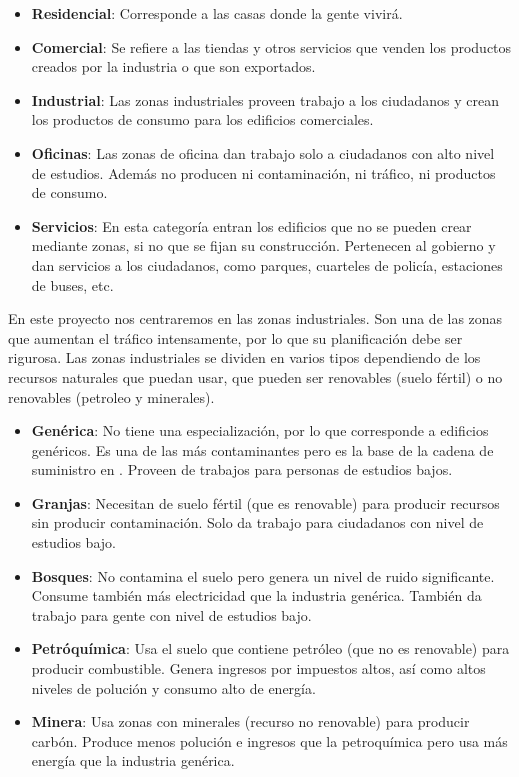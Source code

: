 \begin{itemize}
	\item \textbf{Residencial}: Corresponde a las casas donde la gente vivirá.
	\item \textbf{Comercial}: Se refiere a las tiendas y otros servicios que venden los productos creados por la industria o que son exportados.
	\item \textbf{Industrial}: Las zonas industriales proveen trabajo a los ciudadanos y crean los productos de consumo para los edificios comerciales.
	\item \textbf{Oficinas}: Las zonas de oficina dan trabajo solo a ciudadanos con alto nivel de estudios. Además no producen ni contaminación, ni tráfico, ni productos de consumo.
	\item \textbf{Servicios}: En esta categoría entran los edificios que no se pueden crear mediante zonas, si no que se fijan su construcción. Pertenecen al gobierno y dan servicios a los ciudadanos, como parques, cuarteles de policía, estaciones de buses, etc.
\end{itemize}

En este proyecto nos centraremos en las zonas industriales. Son una de las zonas que aumentan el tráfico intensamente, por lo que su planificación debe ser rigurosa. Las zonas industriales se dividen en varios tipos dependiendo de los recursos naturales que puedan usar, que pueden ser renovables (suelo fértil) o no renovables (petroleo y minerales).

\begin{itemize}
	\item \textbf{Genérica}: No tiene una especialización, por lo que corresponde a edificios genéricos. Es una de las más contaminantes pero es la base de la cadena de suministro en \cities. Proveen de trabajos para personas de estudios bajos.
	\item \textbf{Granjas}: Necesitan de suelo fértil (que es renovable) para producir recursos sin producir contaminación. Solo da trabajo para ciudadanos con nivel de estudios bajo.
	\item \textbf{Bosques}: No contamina el suelo pero genera un nivel de ruido significante. Consume también más electricidad que la industria genérica. También da trabajo para gente con nivel de estudios bajo.
	\item \textbf{Petróquímica}: Usa el suelo que contiene petróleo (que no es renovable) para producir combustible. Genera ingresos por impuestos altos, así como altos niveles de polución y consumo alto de energía.
	\item \textbf{Minera}: Usa zonas con minerales (recurso no renovable) para producir carbón. Produce menos polución e ingresos que la petroquímica pero usa más energía que la industria genérica.
\end{itemize}

